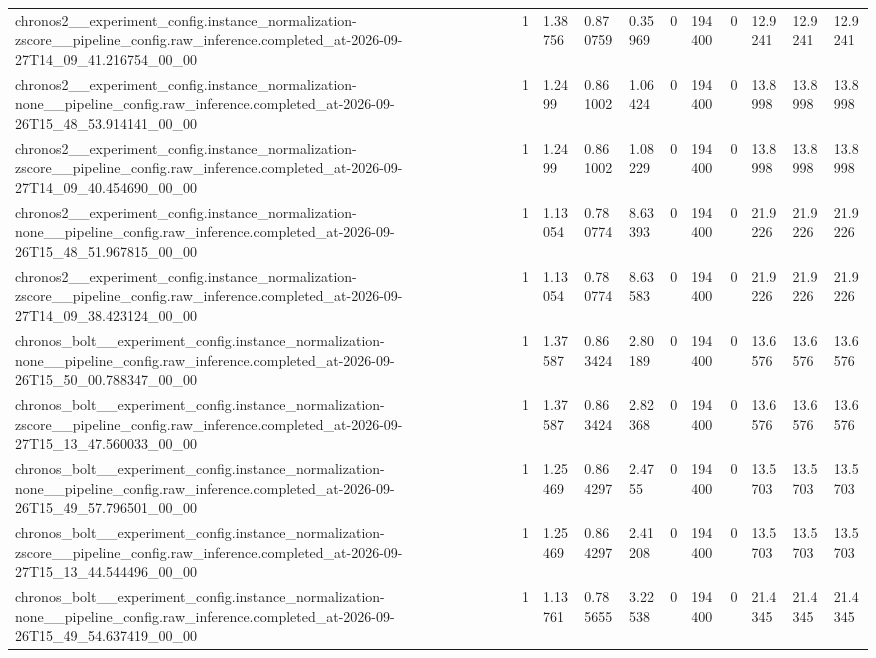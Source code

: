 \begin{tabular}{lllllllllll}
chronos2\_\_experiment\_config.instance\_normalization-zscore\_\_pipeline\_config.raw\_inference.completed\_at-2026-09-27T14\_09\_41.216754\_00\_00 & 1 & 1.38756 & 0.870759 & 0.35969 & 0 & 194400 & 0 & 12.9241 & 12.9241 & 12.9241 \\
chronos2\_\_experiment\_config.instance\_normalization-none\_\_pipeline\_config.raw\_inference.completed\_at-2026-09-26T15\_48\_53.914141\_00\_00 & 1 & 1.2499 & 0.861002 & 1.06424 & 0 & 194400 & 0 & 13.8998 & 13.8998 & 13.8998 \\
chronos2\_\_experiment\_config.instance\_normalization-zscore\_\_pipeline\_config.raw\_inference.completed\_at-2026-09-27T14\_09\_40.454690\_00\_00 & 1 & 1.2499 & 0.861002 & 1.08229 & 0 & 194400 & 0 & 13.8998 & 13.8998 & 13.8998 \\
chronos2\_\_experiment\_config.instance\_normalization-none\_\_pipeline\_config.raw\_inference.completed\_at-2026-09-26T15\_48\_51.967815\_00\_00 & 1 & 1.13054 & 0.780774 & 8.63393 & 0 & 194400 & 0 & 21.9226 & 21.9226 & 21.9226 \\
chronos2\_\_experiment\_config.instance\_normalization-zscore\_\_pipeline\_config.raw\_inference.completed\_at-2026-09-27T14\_09\_38.423124\_00\_00 & 1 & 1.13054 & 0.780774 & 8.63583 & 0 & 194400 & 0 & 21.9226 & 21.9226 & 21.9226 \\
chronos\_bolt\_\_experiment\_config.instance\_normalization-none\_\_pipeline\_config.raw\_inference.completed\_at-2026-09-26T15\_50\_00.788347\_00\_00 & 1 & 1.37587 & 0.863424 & 2.80189 & 0 & 194400 & 0 & 13.6576 & 13.6576 & 13.6576 \\
chronos\_bolt\_\_experiment\_config.instance\_normalization-zscore\_\_pipeline\_config.raw\_inference.completed\_at-2026-09-27T15\_13\_47.560033\_00\_00 & 1 & 1.37587 & 0.863424 & 2.82368 & 0 & 194400 & 0 & 13.6576 & 13.6576 & 13.6576 \\
chronos\_bolt\_\_experiment\_config.instance\_normalization-none\_\_pipeline\_config.raw\_inference.completed\_at-2026-09-26T15\_49\_57.796501\_00\_00 & 1 & 1.25469 & 0.864297 & 2.4755 & 0 & 194400 & 0 & 13.5703 & 13.5703 & 13.5703 \\
chronos\_bolt\_\_experiment\_config.instance\_normalization-zscore\_\_pipeline\_config.raw\_inference.completed\_at-2026-09-27T15\_13\_44.544496\_00\_00 & 1 & 1.25469 & 0.864297 & 2.41208 & 0 & 194400 & 0 & 13.5703 & 13.5703 & 13.5703 \\
chronos\_bolt\_\_experiment\_config.instance\_normalization-none\_\_pipeline\_config.raw\_inference.completed\_at-2026-09-26T15\_49\_54.637419\_00\_00 & 1 & 1.13761 & 0.785655 & 3.22538 & 0 & 194400 & 0 & 21.4345 & 21.4345 & 21.4345 \\

\end{tabular}

